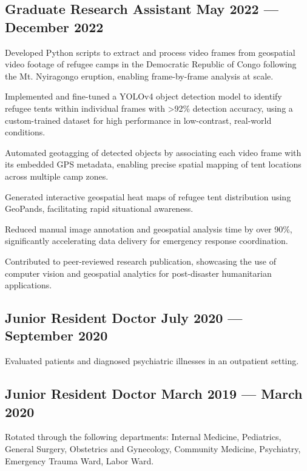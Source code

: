 \subsection{{Graduate Research Assistant \hfill May 2022 --- December 2022}}
\begin{zitemize}
\item Developed Python scripts to extract and process video frames from geospatial video footage of refugee camps in the Democratic Republic of Congo following the Mt. Nyiragongo eruption, enabling frame-by-frame analysis at scale.
\item Implemented and fine-tuned a YOLOv4 object detection model to identify refugee tents within individual frames with >92\% detection accuracy, using a custom-trained dataset for high performance in low-contrast, real-world conditions.
\item Automated geotagging of detected objects by associating each video frame with its embedded GPS metadata, enabling precise spatial mapping of tent locations across multiple camp zones.
\item Generated interactive geospatial heat maps of refugee tent distribution using GeoPands, facilitating rapid situational awareness.
\item Reduced manual image annotation and geospatial analysis time by over 90\%, significantly accelerating data delivery for emergency response coordination.
\item Contributed to peer-reviewed research publication, showcasing the use of computer vision and geospatial analytics for post-disaster humanitarian applications.
\end{zitemize}

\subsection{{Junior Resident Doctor \hfill July 2020 --- September 2020}}
\begin{zitemize}
\item Evaluated patients and diagnosed psychiatric illnesses in an outpatient setting.
\end{zitemize}

\subsection{{Junior Resident Doctor \hfill March 2019 --- March 2020}}
\begin{zitemize}
\item Rotated through the following departments: Internal Medicine, Pediatrics, General Surgery, Obstetrics and Gynecology, Community Medicine, Psychiatry, Emergency Trauma Ward, Labor Ward.
\end{zitemize}